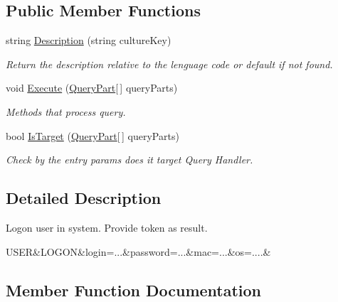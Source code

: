 \subsection*{Public Member Functions}
\begin{DoxyCompactItemize}
\item 
string \mbox{\hyperlink{class_authority_controller_1_1_queries_1_1_u_s_e_r___l_o_g_o_n_af448426be46032c3ae103cdf4ea5f40b}{Description}} (string culture\+Key)
\begin{DoxyCompactList}\small\item\em Return the description relative to the lenguage code or default if not found. \end{DoxyCompactList}\item 
void \mbox{\hyperlink{class_authority_controller_1_1_queries_1_1_u_s_e_r___l_o_g_o_n_a001f81c71597259636be777078e50f7e}{Execute}} (\mbox{\hyperlink{struct_uniform_queries_1_1_query_part}{Query\+Part}}\mbox{[}$\,$\mbox{]} query\+Parts)
\begin{DoxyCompactList}\small\item\em Methods that process query. \end{DoxyCompactList}\item 
bool \mbox{\hyperlink{class_authority_controller_1_1_queries_1_1_u_s_e_r___l_o_g_o_n_a53261c6c60dc1a2324a67adf19f7547a}{Is\+Target}} (\mbox{\hyperlink{struct_uniform_queries_1_1_query_part}{Query\+Part}}\mbox{[}$\,$\mbox{]} query\+Parts)
\begin{DoxyCompactList}\small\item\em Check by the entry params does it target Query Handler. \end{DoxyCompactList}\end{DoxyCompactItemize}


\subsection{Detailed Description}
Logon user in system. Provide token as result. 

U\+S\+ER\&L\+O\+G\+ON\&login=...\&password=...\&mac=...\&os=....\& 

\subsection{Member Function Documentation}
\mbox{\label{class_authority_controller_1_1_queries_1_1_u_s_e_r___l_o_g_o_n_af448426be46032c3ae103cdf4ea5f40b}} 
